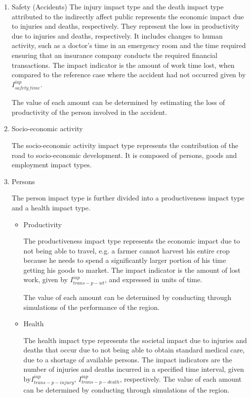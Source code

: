 \begin{enumerate}
 \item Safety (Accidents)
The injury impact type and the death impact type attributed to the indirectly affect public represents the economic impact due to injuries and deaths, respectively. They represent the loss in productivity due to injuries and deaths, respectively. It includes changes to human activity, such as a doctor's time in an emergency room and the time required ensuring that an insurance company conducts the required financial transactions. The impact indicator is the amount of work time lost, when compared to the reference case where the accident had not occurred given by $I_{safety\_time}^{iap}$.

The value of each amount can be determined by estimating the loss of productivity of the person involved in the accident.

\item Socio-economic activity

The socio-economic activity impact type represents the contribution of the road to socio-economic development. It is composed of persons, goods and employment impact types.

\item Persons

The person impact type is further divided into a productiveness impact type and a health impact type. 

\begin{itemize}
\item Productivity

The productiveness impact type represents the economic impact due to not being able to travel, e.g. a farmer cannot harvest his entire crop because he needs to spend a significantly larger portion of his time getting his goods to market. The impact indicator is the amount of lost work, given by $I_{trans - p - wt}^{iap}$, and expressed in units of time. 

The value of each amount can be determined by conducting through simulations of the performance of the region. 

\item Health

The health impact type represents the societal impact due to injuries and deaths that occur due to not being able to obtain standard medical care, due to a shortage of available persons. The impact indicators are the number of injuries and deaths incurred in a specified time interval, given by$I_{trans - p - injury}^{iap}$, $I_{trans - p - death}^{iap}$, respectively. The value of each amount can be determined by conducting through simulations of the region.
\end{itemize}


\end{enumerate}
